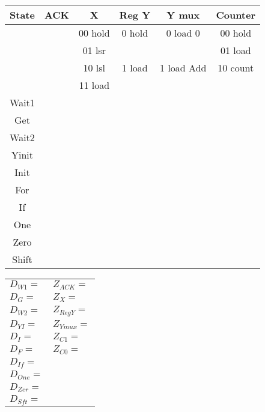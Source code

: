 \begin{description}
        \begin{tabular}{c||c|c|c|c|c}
            State   & ACK       &   X         &  Reg Y    & Y mux         & Counter       \\ \hline
            &           &   00 hold   &  0 hold   & 0 load 0      & 00 hold       \\ \hline
            &           &   01 lsr    &           &               & 01 load       \\ \hline
            &           &   10 lsl    &  1 load   & 1 load Add    & 10 count      \\ \hline
            &           &   11 load   &           &               &               \\ \hline \hline
            Wait1   &          &           &          &              &             \\ \hline
            Get     &          &           &          &              &             \\ \hline
            Wait2   &          &           &          &              &             \\ \hline
            Yinit   &          &           &          &              &             \\ \hline
            Init    &          &           &          &              &             \\ \hline
            For     &          &           &          &              &             \\ \hline
            If      &          &           &          &              &             \\ \hline
            One     &          &           &          &              &             \\ \hline
            Zero    &          &           &          &              &             \\ \hline
            Shift   &          &           &          &              &             \\
        \end{tabular}

        \begin{tabular}{p{2in}p{1in}}
            $D_{W1} =$    &    $Z_{ACK} =$          \\
            $D_{G} = $    &    $Z_{X} = $        \\
            $D_{W2} =$    &    $Z_{RegY} =$      \\
            $D_{YI} =$     &    $Z_{Ymux} =$         \\
            $D_{I} = $    &    $Z_{C1} =$         \\
            $D_{F} = $    &    $Z_{C0} =$         \\
            $D_{If} =$     &                \\
            $D_{One} =$     &                \\
            $D_{Zer} =$     &                \\
            $D_{Sft} =$     &                \\
        \end{tabular}


\end{description}
